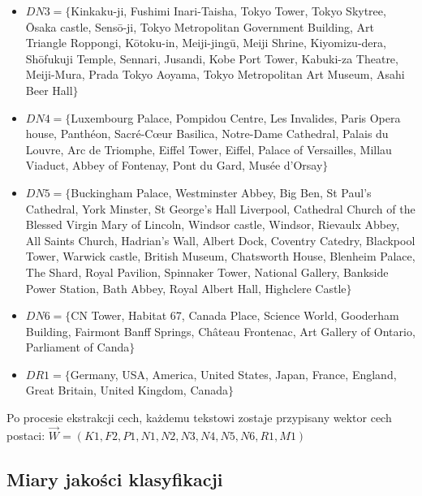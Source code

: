 \documentclass{classrep}
\begin{document}
\begin{itemize}
\item $DN3 = \{$Kinkaku-ji, Fushimi Inari-Taisha, Tokyo Tower, Tokyo Skytree,  Ōsaka castle, Sensō-ji, Tokyo Metropolitan Government Building, Art Triangle Roppongi, Kōtoku-in, Meiji-jingū, Meiji Shrine, Kiyomizu-dera, Shōfukuji Temple, Sennari, Jusandi, Kobe Port Tower, Kabuki-za Theatre, Meiji-Mura, Prada Tokyo Aoyama, Tokyo Metropolitan Art Museum, Asahi Beer Hall$\} $
\item $DN4 = \{$Luxembourg Palace, Pompidou Centre, Les Invalides, Paris Opera house, Panthéon, Sacré-Cœur Basilica, Notre-Dame Cathedral, Palais du Louvre, Arc de Triomphe, Eiffel Tower, Eiffel, Palace of Versailles, Millau Viaduct, Abbey of Fontenay, Pont du Gard, Musée d'Orsay$\} $
\item $DN5 = \{$Buckingham Palace, Westminster Abbey, Big Ben, St Paul's Cathedral, York Minster, St George's Hall Liverpool, Cathedral Church of the Blessed Virgin Mary of Lincoln, Windsor castle, Windsor, Rievaulx Abbey, All Saints Church, Hadrian's Wall, Albert Dock, Coventry Catedry, Blackpool Tower, Warwick castle, British Museum, Chatsworth House, Blenheim Palace, The Shard, Royal Pavilion, Spinnaker Tower, National Gallery, Bankside Power Station, Bath Abbey, Royal Albert Hall, Highclere Castle$\} $
\item $DN6 = \{$CN Tower, Habitat 67, Canada Place, Science World, Gooderham Building, Fairmont Banff Springs, Château Frontenac, Art Gallery of Ontario, Parliament of Canda$\} $
\item $DR1 = \{$Germany, USA, America, United States, Japan, France, England, Great Britain, United Kingdom, Canada$\}$
\end{itemize} \hfill \break
Po procesie ekstrakcji cech, każdemu tekstowi zostaje przypisany wektor cech postaci:
$\vec{W} = (K1, F2, P1, N1, N2, N3, N4, N5, N6, R1, M1)$

\subsection{Miary jakości klasyfikacji}
\end{document}
